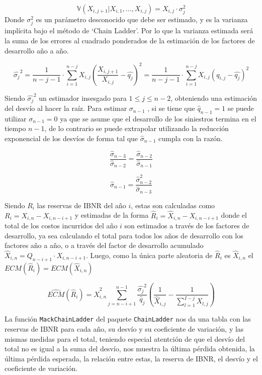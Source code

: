 \documentclass[
  12pt,
]{article}
\begin{document}
\[
\mathbb{V}(X_{i,j+1}|X_{i,1},\ldots,X_{i,j}) = X_{i,j}\cdot \sigma_j^2
\] Donde \(\sigma_j^2\) es un parámetro desconocido que debe ser
estimado, y es la varianza implícita bajo el método de `Chain Ladder'.
Por lo que la varianza estimada será la suma de los errores al cuadrado
ponderados de la estimación de los factores de desarrollo año a año.

\[
\hat{\sigma_j}^2 = \frac{1}{n-j-1}\cdot \sum_{i=1}^{n-j} X_{i,j}\left( \frac{X_{i,j+1}}{X_{i,j}} - \hat{q_j} \right)^2=\frac{1}{n-j-1}\cdot \sum_{i=1}^{n-j} X_{i,j}\left( q_{i,j} - \hat{q_j} \right)^2
\]

Siendo \(\hat{\sigma_j}^2\) un estimador insesgado para
\(1 \leq j \leq n-2\), obteniendo una estimación del desvío al hacer la
raíz. Para estimar \(\sigma_{n-1}\) , si se tiene que
\(\hat{q}_{n-1}=1\) se puede utilizar \(\sigma_{n-1}=0\) ya que se asume
que el desarrollo de los siniestros termina en el tiempo \(n-1\), de lo
contrario se puede extrapolar utilizando la reducción exponencial de los
desvíos de forma tal que \(\hat{\sigma}_{n-1}\) cumpla con la razón.

\[
\frac{\hat{\sigma}_{n-3}}{\hat{\sigma}_{n-2}} = \frac{\hat{\sigma}_{n-2}}{\hat{\sigma}_{n-1}}
\]

\[
\hat{\sigma}_{n-1} = \frac{\hat{\sigma}_{n-2}^2}{\hat{\sigma}_{n-3}}
\]

Siendo \(R_i\) las reservas de IBNR del año \(i\), estas son calculadas
como \(R_i = X_{i,n} - X_{i,n-i+1}\) y estimadas de la forma
\(\hat{R}_i = \hat{X}_{i,n} - X_{i,n-i+1}\) donde el total de los costos
incurridos del año \(i\) son estimados a través de los factores de
desarrollo, ya sea calculando el total para todos los años de desarrollo
con los factores año a año, o a través del factor de desarrollo
acumulado \(\hat{X}_{i,n} = Q_{n-i+1}\cdot X_{i,n-i+1}\). Luego, como la
única parte aleatoria de \(\hat{R}_i\) es \(\hat{X}_{i,n}\) el
\(ECM(\hat{R}_i) = ECM(\hat{X}_{i,n})\)

\[
\widehat{ECM}(\hat{R}_i) = \hat{X}_{i,n}^2 \sum_{j=n-i+1}^{n-1} \frac{\hat{\sigma_j}^2}{\hat{q}_j}\left( \frac{1}{\hat{X}_{i,j}} - \frac{1}{\sum_{l=1}^{I-j}X_{l,j}} \right)
\]

La función \texttt{MackChainLadder} del paquete \texttt{ChainLadder} nos
da una tabla con las reservas de IBNR para cada año, su desvío y su
coeficiente de variación, y las mismas medidas para el total, teniendo
especial atentción de que el desvío del total no es igual a la suma del
desvío, nos muestra la última pérdida obtenida, la última pérdida
esperada, la relación entre estas, la reserva de IBNR, el desvío y el
coeficiente de variación.
\end{document}
